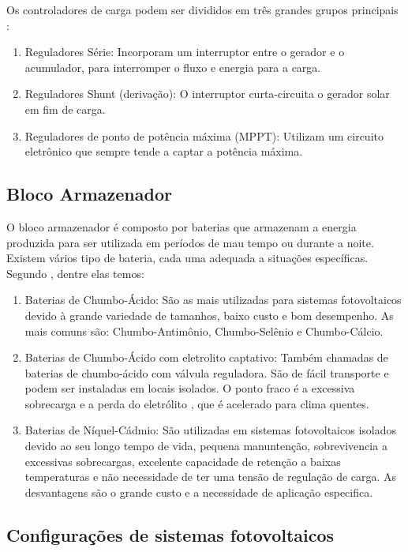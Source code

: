 Os controladores de carga podem ser divididos em três grandes grupos principais \cite{da2008projeto}: 

\begin{enumerate}
    \item Reguladores Série: Incorporam um interruptor entre o gerador e o acumulador, para interromper o fluxo e energia para a carga.
	\item Reguladores Shunt (derivação): O interruptor curta-circuita o gerador solar em fim de carga.
	\item Reguladores de ponto de potência máxima (MPPT): Utilizam um circuito eletrônico que sempre tende a captar a potência máxima. 
\end{enumerate}

\subsection{Bloco Armazenador}

O bloco armazenador é composto por baterias que armazenam a energia produzida para ser utilizada em períodos de mau tempo ou durante a noite. Existem vários tipo de bateria, cada uma adequada a situações específicas. Segundo \cite{ecycleconheca}, dentre elas temos:

\begin{enumerate}
    \item Baterias de Chumbo-Ácido: São as mais utilizadas para sistemas fotovoltaicos devido à grande variedade de tamanhos, baixo custo e bom desempenho. As mais comuns são: Chumbo-Antimônio, Chumbo-Selênio e Chumbo-Cálcio.
	\item Baterias de Chumbo-Ácido com eletrolito captativo: Também chamadas de baterias de chumbo-ácido com válvula reguladora. São de fácil transporte e podem ser instaladas em locais isolados. O ponto fraco é a excessiva sobrecarga e a perda do eletrólito , que é acelerado para clima quentes.
	\item Baterias de Níquel-Cádmio:  São utilizadas em sistemas fotovoltaicos isolados devido ao seu longo tempo de vida, pequena manuntenção, sobrevivencia a excessivas sobrecargas, excelente capacidade de retenção a baixas temperaturas e não necessidade de ter uma tensão de regulação de carga. As desvantagens são o grande custo e a necessidade de aplicação especifica. 
\end{enumerate}

\subsection{Configurações de sistemas fotovoltaicos}

